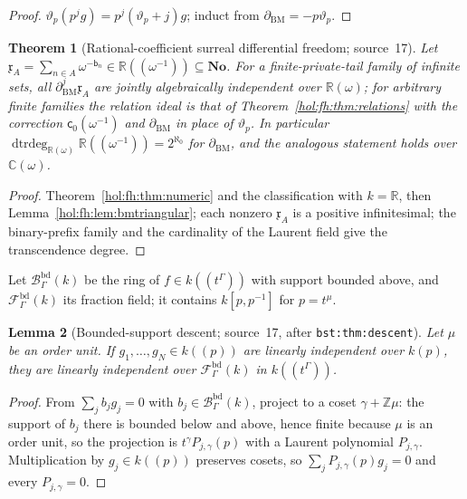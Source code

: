\documentclass[11pt]{article}
\numberwithin{equation}{section}
\newtheorem{theorem}{Theorem}[section]
\newtheorem{lemma}[theorem]{Lemma}
\theoremstyle{definition}
\theoremstyle{remark}
\newcommand{\C}{\mathbb C}
\newcommand{\R}{\mathbb R}
\newcommand{\Z}{\mathbb Z}
\newcommand{\No}{\mathbf{No}}
\newcommand{\dtrdeg}{\operatorname{dtrdeg}}
\begin{document}
\begin{proof}
$\vartheta_p(p^jg)=p^j(\vartheta_p+j)g$; induct from
$\partial_{\mathrm{BM}}=-p\vartheta_p$.
\end{proof}

\begin{theorem}[Rational-coefficient surreal differential freedom;
source~17]\label{hol:fh:thm:surreal}
Let $\mathfrak x_A=\sum_{n\in A}\omega^{-\mathsf b_n}\in\R((\omega^{-1}))
\subseteq\No$. For a finite-private-tail family of infinite sets, all
$\partial_{\mathrm{BM}}^j\mathfrak x_A$ are jointly algebraically independent
over $\R(\omega)$; for arbitrary finite families the relation ideal is that of
Theorem~\ref{hol:fh:thm:relations} with the correction $\mathsf c_0(\omega^{-1})$
and $\partial_{\mathrm{BM}}$ in place of $\vartheta_p$. In particular
$\dtrdeg_{\R(\omega)}\R((\omega^{-1}))=2^{\aleph_0}$ for $\partial_{\mathrm{BM}}$,
and the analogous statement holds over $\C(\omega)$.
\end{theorem}

\begin{proof}
Theorem~\ref{hol:fh:thm:numeric} and the classification with $k=\R$, then
Lemma~\ref{hol:fh:lem:bmtriangular}; each nonzero $\mathfrak x_A$ is a positive
infinitesimal; the binary-prefix family and the cardinality of the Laurent
field give the transcendence degree.
\end{proof}

Let $\mathcal B^{\mathrm{bd}}_\Gamma(k)$ be the ring of $f\in k((t^\Gamma))$ with
support bounded above, and $\mathcal F^{\mathrm{bd}}_\Gamma(k)$ its fraction
field; it contains $k[p,p^{-1}]$ for $p=t^\mu$.

\begin{lemma}[Bounded-support descent; source~17, after
\texttt{bst:thm:descent}]\label{hol:fh:lem:bounded}
Let $\mu$ be an order unit. If $g_1,\ldots,g_N\in k((p))$ are linearly
independent over $k(p)$, they are linearly independent over
$\mathcal F^{\mathrm{bd}}_\Gamma(k)$ in $k((t^\Gamma))$.
\end{lemma}

\begin{proof}
From $\sum_jb_jg_j=0$ with $b_j\in\mathcal B^{\mathrm{bd}}_\Gamma(k)$, project to
a coset $\gamma+\Z\mu$: the support of $b_j$ there is bounded below and above,
hence finite because $\mu$ is an order unit, so the projection is
$t^\gamma P_{j,\gamma}(p)$ with a Laurent polynomial $P_{j,\gamma}$.
Multiplication by $g_j\in k((p))$ preserves cosets, so
$\sum_jP_{j,\gamma}(p)g_j=0$ and every $P_{j,\gamma}=0$.
\end{proof}
\end{document}
